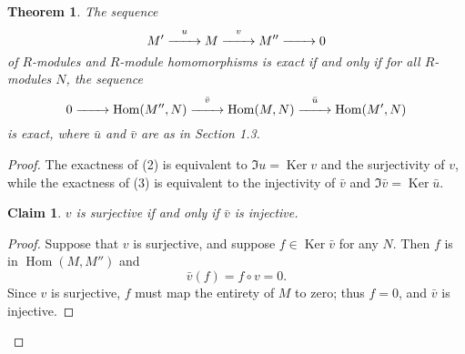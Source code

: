 \documentclass[11pt]{article}
\newtheorem{theorem}{Theorem}
\newtheorem{claim}{Claim}
\newcommand{\Hom}{\operatorname{Hom}}
\newcommand{\Ker}{\operatorname{Ker}}
\renewcommand{\longrightarrow}{\xrightarrow{\hspace*{0.7cm}}}
\begin{document}
\begin{adjustwidth}{1cm}{}
	\begin{theorem}
		The sequence
		\begin{equation}
			M' \stackrel{u}{\longrightarrow} M \stackrel{v}{\longrightarrow} M'' \longrightarrow 0
		\end{equation}
		of $R$-modules and $R$-module homomorphisms is exact if and only if for all $R$-modules $N$, the sequence
		\begin{equation}
			0 \longrightarrow \Hom(M'', N) \stackrel{\bar{v}}{\longrightarrow} \Hom(M, N) \stackrel{\bar{u}}{\longrightarrow} \Hom(M', N)
		\end{equation}
		is exact, where $\bar{u}$ and $\bar{v}$ are as in Section 1.3.
	\end{theorem}
	\newpage
	\begin{proof}
		The exactness of (2) is equivalent to $\Im u = \Ker v$ and the surjectivity of $v$, while the exactness of (3) is equivalent to the injectivity of $\bar{v}$ and $\Im \bar{v} = \Ker \bar{u}$.
		\begin{adjustwidth}{1cm}{}
			\begin{claim}
				$v$ is surjective if and only if $\bar{v}$ is injective.
			\end{claim}
			\begin{proof}\renewcommand{\qedsymbol}{}
				Suppose that $v$ is surjective, and suppose $f \in \Ker \bar{v}$ for any $N$. Then $f$ is in $\Hom(M, M'')$ and
				\[
					\bar{v}(f) = f \circ v = 0.
				\]
				Since $v$ is surjective, $f$ must map the entirety of $M$ to zero; thus $f = 0$, and $\bar{v}$ is injective.


\end{proof}
\end{adjustwidth}
\end{proof}
\end{adjustwidth}
\end{document}
